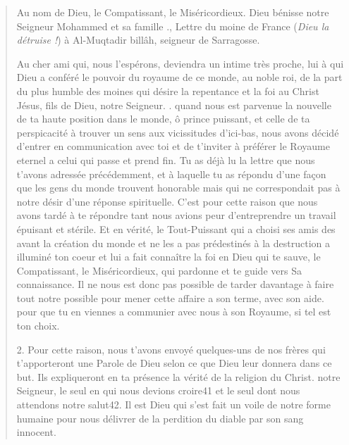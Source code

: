 \begin{quote}

Au nom de Dieu, le Compatissant, le Miséricordieux. Dieu bénisse notre
Seigneur Mohammed et sa famille .,
    Lettre du moine de France (\textit{Dieu la détruise !})
à
Al-Muqtadir billâh, seigneur de Sarragosse.


Au cher ami qui, nous l'espérons, deviendra un intime très proche, lui à
qui Dieu a conféré le pouvoir du royaume de ce monde, au noble roi, de la part
du plus humble des moines qui désire la repentance et la foi au Christ Jésus, fils de
Dieu, notre Seigneur.
. quand nous est parvenue la nouvelle de ta haute position dans le monde, ô
prince puissant, et celle de ta perspicacité à trouver un sens aux vicissitudes d'ici-bas,
nous avons décidé d'entrer en communication avec toi et de t'inviter à préférer
le Royaume eternel a celui qui passe et prend fin. Tu as déjà lu la lettre que nous
t'avons adressée précédemment, et à laquelle tu as répondu d'une façon que les gens
du monde trouvent honorable mais qui ne correspondait pas à notre désir d'une
réponse spirituelle.
C'est pour cette raison que nous avons tardé à te répondre tant nous avions
peur d'entreprendre un travail épuisant et stérile. Et en vérité, le Tout-Puissant qui
a choisi ses amis des avant la création du monde  et ne les a pas prédestinés à la
destruction a illuminé ton coeur et lui a fait connaître la foi en Dieu qui te sauve, le Compatissant, le Miséricordieux, qui pardonne et te guide vers Sa connaissance. Il ne nous est donc pas possible de tarder davantage à faire tout notre
possible pour mener cette affaire a son terme, avec son aide. pour que tu en viennes
a communier avec nous à son Royaume, si tel est ton choix.


2. Pour cette raison, nous t'avons envoyé quelques-uns de nos frères qui
t'apporteront une Parole de Dieu selon ce que Dieu leur donnera dans ce but. Ils
expliqueront en ta présence la vérité de la religion du Christ. notre Seigneur, le seul
en qui nous devions croire41 et le seul dont nous attendons notre salut42. Il est
Dieu qui s'est fait un voile de notre forme humaine pour nous délivrer de la
perdition du diable par son sang innocent.



\end{quote}
